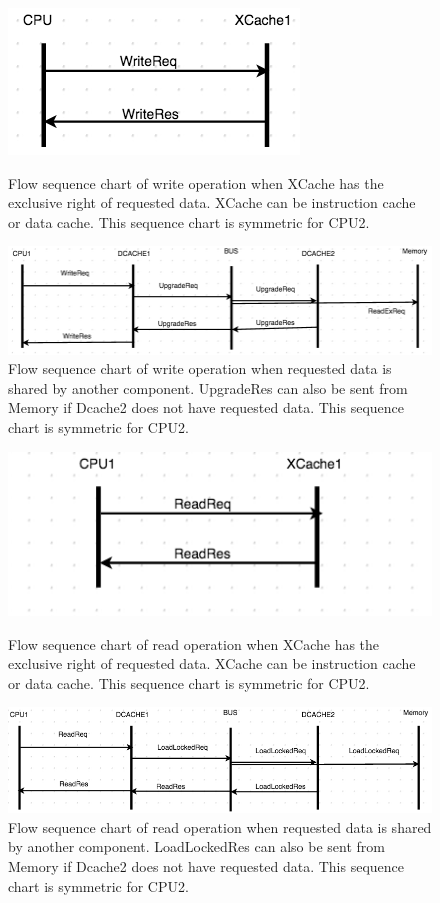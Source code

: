 \documentclass[12pt,frontmatter,copyright,thesis]{usfmanus}
\begin{document}
\begin{appendix}
\begin{figure}[h]
 \centering
 \includegraphics[width=2In]{figures/write1.png}
 \caption{\footnotesize Flow sequence chart of write operation when XCache has the exclusive right of requested data. XCache can be instruction cache or data cache. This sequence chart is symmetric for CPU2. }
 \label{write1}
   \centering
 \includegraphics[width=4.6In]{figures/write2.png}
 \caption{\footnotesize Flow sequence chart of write operation when requested data is shared by another component. UpgradeRes can also be sent from Memory if Dcache2 does not have requested data. This sequence chart is symmetric for CPU2. }
 \label{write2}
 \end{figure}
\begin{figure}[h] 
 \centering
 \includegraphics[width=2In]{figures/read1.png}
 \caption{\footnotesize Flow sequence chart of read operation when XCache has the exclusive right of requested data. XCache can be instruction cache or data cache. This sequence chart is symmetric for CPU2. }
 \label{read1}
 
 \centerline{
 \includegraphics[width=4.1In]{figures/read3.png}}
 \caption{\footnotesize Flow sequence chart of read operation when requested data is shared by another component. LoadLockedRes can also be sent from Memory if Dcache2 does not have requested data. This sequence chart is symmetric for CPU2. }
 \label{read3}


\end{figure}
\end{appendix}
\end{document}
